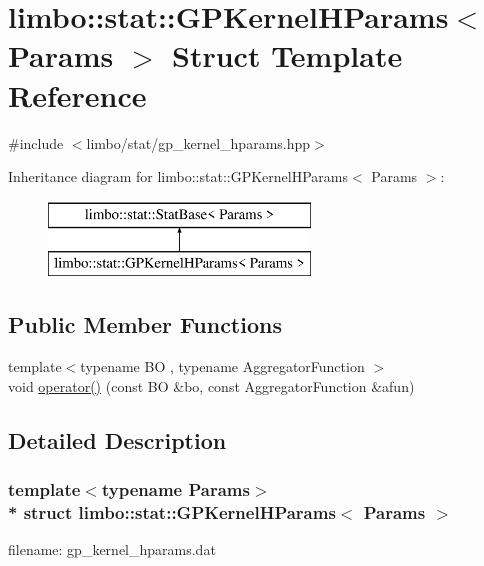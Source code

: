 \hypertarget{structlimbo_1_1stat_1_1_g_p_kernel_h_params}{}\section{limbo\+:\+:stat\+:\+:G\+P\+Kernel\+H\+Params$<$ Params $>$ Struct Template Reference}
\label{structlimbo_1_1stat_1_1_g_p_kernel_h_params}


{\ttfamily \#include $<$limbo/stat/gp\+\_\+kernel\+\_\+hparams.\+hpp$>$}

Inheritance diagram for limbo\+:\+:stat\+:\+:G\+P\+Kernel\+H\+Params$<$ Params $>$\+:\begin{figure}[H]
\begin{center}
\leavevmode
\includegraphics[height=2.000000cm]{structlimbo_1_1stat_1_1_g_p_kernel_h_params}
\end{center}
\end{figure}
\subsection*{Public Member Functions}
\begin{DoxyCompactItemize}
\item 
{\footnotesize template$<$typename BO , typename Aggregator\+Function $>$ }\\void \hyperlink{structlimbo_1_1stat_1_1_g_p_kernel_h_params_aa69a6377279cb199ec043ad98b9d5db7}{operator()} (const BO \&bo, const Aggregator\+Function \&afun)
\end{DoxyCompactItemize}


\subsection{Detailed Description}
\subsubsection*{template$<$typename Params$>$\\*
struct limbo\+::stat\+::\+G\+P\+Kernel\+H\+Params$<$ Params $>$}

filename\+: {\ttfamily gp\+\_\+kernel\+\_\+hparams.\+dat} 


